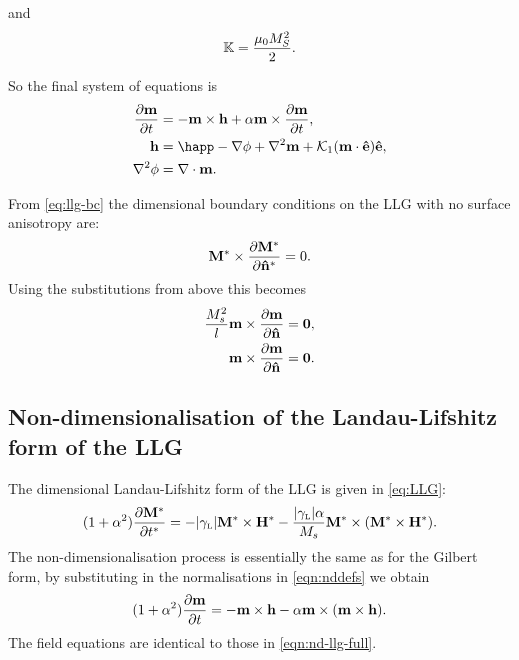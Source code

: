 and
\begin{equation}
  \label{k-normalisation}
  \mathbb{K} = \frac{ \mu_0 M_S^2}{2}.
\end{equation}

So the final system of equations is
\begin{equation}
  \begin{aligned}
    \dmdt &= - \mv \times \hv + \alpha \mv \times \dmdt, \\
    \hv &= \happ - \nabla \phi + \lap \mv + \kone (\mv \cdot \ev) \ev, \\
    \lap \phi &= \nabla \cdot \mv.
    \label{eqn:nd-llg-full}
  \end{aligned}
\end{equation}

From \cref{eq:llg-bc} the dimensional boundary conditions on the LLG with no surface anisotropy are:
\begin{equation}
  \mathbf{M}^* \times \frac{\partial \mathbf{M}^*}{\partial \mathbf{\hat{n}}^*} = 0.
\end{equation}
Using the substitutions from above this becomes
\begin{equation}
  \begin{aligned}
    \frac{M_s^2}{l} \mathbf{m} \times \frac{\partial \mathbf{m}}{\partial \mathbf{\hat{n}}} &= \mathbf{0}, \\
    \mathbf{m} \times \frac{\partial \mathbf{m}}{\partial \mathbf{\hat{n}}} &= \mathbf{0}.
  \end{aligned}
\end{equation}

\subsection{Non-dimensionalisation of the Landau-Lifshitz form of the LLG}
\label{sec:land-lifsh-normalisation}

The dimensional Landau-Lifshitz form of the LLG is given in \cref{eq:LLG}:
\begin{equation}
  \label{eq:ll-nd}
  (1 + \alpha^2) \frac{\partial \mathbf{M}^*}{\partial t^*} = - {\left|{\gamma_{\text{\tiny{L}}}} \right|} \mathbf{M}^* \times \mathbf{H}^*
  - \frac{{\left|{\gamma_{\text{\tiny{L}}}} \right|} \alpha}{M_s} \mathbf{M}^* \times (\mathbf{M}^* \times \mathbf{H}^*).
\end{equation}
The non-dimensionalisation process is essentially the same as for the Gilbert form, by substituting in the normalisations in \cref{eqn:nddefs} we obtain
\begin{equation}
  (1 + \alpha^2) \frac{\partial \mathbf{m}}{\partial t} = - \mathbf{m} \times \mathbf{h} - \alpha \mathbf{m} \times (\mathbf{m} \times \mathbf{h}).
  \label{eq:ll-nd-llglike}
\end{equation}
The field equations are identical to those in \cref{eqn:nd-llg-full}.


